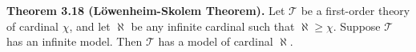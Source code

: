 \textbf{Theorem 3.18 (Löwenheim-Skolem Theorem).} Let $\mathcal{T}$ be a first-order theory of cardinal $\chi$, and let $\aleph$ be any infinite cardinal such that $\aleph \geqslant \chi$. Suppose $\mathcal{T}$ has an infinite model. Then $\mathcal{T}$ has a model of cardinal $\aleph$.
